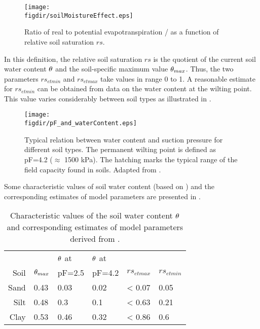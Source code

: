 \begin{figure}
  \centering
  \texttt{[image: \\figdir/soilMoistureEffect.eps]}
  \caption{Ratio of real to potential evapotranspiration \etReal/\etPot{} as a function of relative soil saturation $rs$. \label{fig:et:real:soilmoisture}}
\end{figure}

In this definition, the relative soil saturation $rs$ is the quotient of the current soil water content $\theta$ and the soil-specific maximum value $\theta_{max}$. Thus, the two parameters $rs_{et min}$ and $rs_{et max}$ take values in range 0 to 1. A reasonable estimate for $rs_{et min}$ can be obtained from data on the water content at the wilting point. This value varies considerably between soil types as illustrated in .

\begin{figure}
  \centering
  \texttt{[image: \\figdir/pF\_and\_waterContent.eps]}
  \caption{Typical relation between water content and suction pressure for different soil types. The permanent wilting point is defined as pF=4.2 ($\approx$ 1500 kPa). The hatching marks the typical range of the field capacity found in soils. Adapted from \citet{Scheffer1998}. \label{fig:et:real:pFCurve}}
\end{figure}

Some characteristic values of soil water content (based on ) and the corresponding estimates of model parameters are presented in .

\begin{table}
  \caption{Characteristic values of the soil water content $\theta$ and corresponding estimates of model parameters derived from . \label{tab:et:real:soilmoisture}}
  {\small
  \begin{tabular}{|rlllll|} \hline
    \rowcolor[gray]{0.9}
         &                        & $\theta$ at & $\theta$ at & & \\
    \rowcolor[gray]{0.9}
    Soil & $\theta_{max}$ & pF=2.5 & pF=4.2 & $rs_{et max}$ & $rs_{et min}$ \\ \hline
    Sand & 0.43 & 0.03 & 0.02 & < 0.07 & 0.05 \\
    Silt & 0.48 & 0.3  & 0.1  & < 0.63 & 0.21 \\
    Clay & 0.53 & 0.46 & 0.32 & < 0.86 & 0.6 \\
  \hline
  \end{tabular} 
  }
\end{table}
